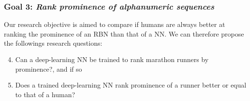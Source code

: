 \subsubsection*{Goal 3: \itshape Rank prominence of alphanumeric sequences}

Our research objective is aimed to compare if humans are always better at ranking the prominence of an RBN than that of a NN.
We can therefore propose the followings research questions:
\begin{enumerate}[label=\bfseries~RQ\arabic*), leftmargin=2cm, rightmargin=1.5cm]
  \setcounter{enumi}{3}
  \item\label{rq:4} Can a deep-learning NN be trained to rank marathon runners by prominence?, and if so
  \item\label{rq:5} Does a trained deep-learning NN rank prominence of a runner better or equal to that of a human?
\end{enumerate}
